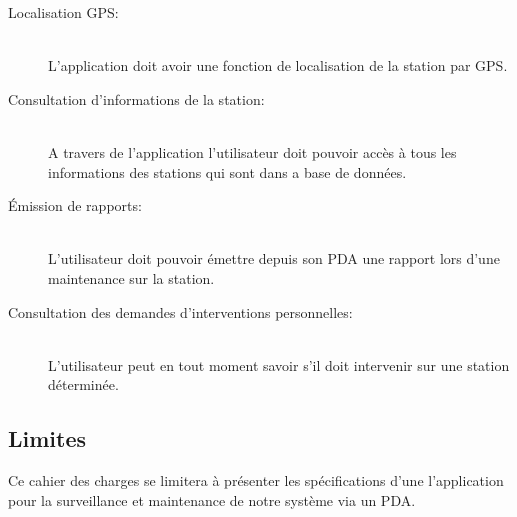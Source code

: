 \begin{description}
\item [Localisation GPS:]\\
L'application doit avoir une fonction de localisation de la station par GPS.\\

\item [Consultation d'informations de la station:]\\
A travers de l'application l'utilisateur doit pouvoir accès à tous les informations des stations 
qui sont dans a base de données.\\

\item [Émission de rapports:]\\
L'utilisateur doit pouvoir émettre depuis son PDA une rapport lors d'une maintenance sur la station. 

\item [Consultation des demandes d’interventions personnelles:]\\
L'utilisateur peut en tout moment savoir s'il doit intervenir sur une station déterminée.\\

\end{description}

\subsection{Limites}

Ce cahier des charges se limitera à présenter les spécifications d'une l'application
pour la surveillance et maintenance de notre système via un PDA.
